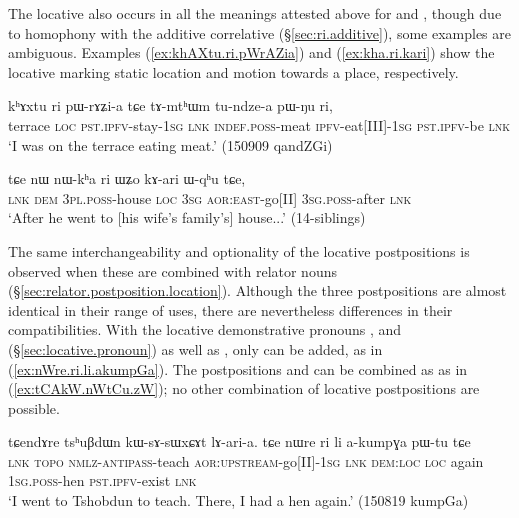  The locative  also occurs in all the meanings attested above for  and , though due to homophony with the additive correlative  (§\ref{sec:ri.additive}), some examples are ambiguous. Examples (\ref{ex:khAXtu.ri.pWrAZia}) and (\ref{ex:kha.ri.kari}) show the locative  marking static location and motion towards a place, respectively.

\begin{exe}
\ex \label{ex:khAXtu.ri.pWrAZia}
\gll   kʰɤxtu ri pɯ-rɤʑi-a tɕe tɤ-mtʰɯm tu-ndze-a pɯ-ŋu ri, \\
terrace \textsc{loc} \textsc{pst}.\textsc{ipfv}-stay-\textsc{1sg} \textsc{lnk} \textsc{indef}.\textsc{poss}-meat \textsc{ipfv}-eat[III]-\textsc{1sg} \textsc{pst}.\textsc{ipfv}-be \textsc{lnk} \\
\glt `I was on the terrace eating meat.' (150909 qandZGi) 
 \end{exe}
 
 \begin{exe}
\ex \label{ex:kha.ri.kari}
\gll   tɕe nɯ nɯ-kʰa ri ɯʑo kɤ-ari ɯ-qʰu tɕe, \\
\textsc{lnk} \textsc{dem} \textsc{3pl}.\textsc{poss}-house \textsc{loc} \textsc{3sg} \textsc{aor}:\textsc{east}-go[II] \textsc{3sg}.\textsc{poss}-after \textsc{lnk} \\
\glt `After he went to [his wife's family's] house...' (14-siblings) 
  \end{exe}
  
The same interchangeability and optionality of the locative postpositions is observed when these are combined with relator nouns (§\ref{sec:relator.postposition.location}). Although the three postpositions are almost identical in their range of uses, there are nevertheless differences in their compatibilities.  With the locative demonstrative pronouns , and   (§\ref{sec:locative.pronoun}) as well as , only  can be added, as in (\ref{ex:nWre.ri.li.akumpGa}). The postpositions  and  can be combined as  as in (\ref{ex:tCAkW.nWtCu.zW}); no other combination of locative postpositions are possible.

 \begin{exe}
\ex \label{ex:nWre.ri.li.akumpGa}
\gll tɕendɤre tsʰuβdɯn kɯ-sɤ-sɯxɕɤt lɤ-ari-a. tɕe nɯre ri li a-kumpɣa pɯ-tu tɕe \\
\textsc{lnk}  \textsc{topo} \textsc{nmlz}-\textsc{antipass}-teach \textsc{aor}:\textsc{upstream}-go[II]-\textsc{1sg} \textsc{lnk} \textsc{dem}:\textsc{loc} \textsc{loc} again \textsc{1sg}.\textsc{poss}-hen \textsc{pst}.\textsc{ipfv}-exist \textsc{lnk} \\
\glt `I went to Tshobdun to teach. There, I had a hen again.' (150819 kumpGa) 
  \end{exe}

